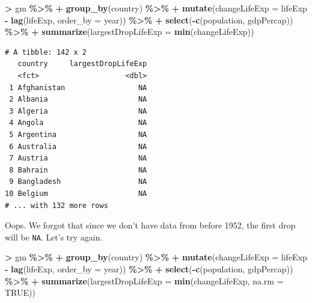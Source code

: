 \documentclass[
]{krantz}
\makeatletter
\newenvironment{Shaded}{\begin{snugshade}}{\end{snugshade}}
\newcommand{\DataTypeTok}[1]{\textcolor[rgb]{0.27,0.27,0.27}{#1}}
\newcommand{\KeywordTok}[1]{\textcolor[rgb]{0.27,0.27,0.27}{\textbf{#1}}}
\newcommand{\NormalTok}[1]{#1}
\newcommand{\OperatorTok}[1]{\textcolor[rgb]{0.43,0.43,0.43}{\textbf{#1}}}
\newcommand{\OtherTok}[1]{\textcolor[rgb]{0.37,0.37,0.37}{#1}}
\newcommand{\StringTok}[1]{\textcolor[rgb]{0.5,0.5,0.5}{#1}}
\newenvironment{kframe}{%
\medskip{}
\setlength{\fboxsep}{.8em}
 \def\at@end@of@kframe{}%
 \ifinner\ifhmode%
  \def\at@end@of@kframe{\end{minipage}}%
  \begin{minipage}{\columnwidth}%
 \fi\fi%
 \def\FrameCommand##1{\hskip\@totalleftmargin \hskip-\fboxsep
 \colorbox{shadecolor}{##1}\hskip-\fboxsep
     \hskip-\linewidth \hskip-\@totalleftmargin \hskip\columnwidth}%
 \MakeFramed {\advance\hsize-\width
   \@totalleftmargin\z@ \linewidth\hsize
   \@setminipage}}%
 {\par\unskip\endMakeFramed%
 \at@end@of@kframe}
\renewenvironment{Shaded}{\begin{kframe}}{\end{kframe}}
\makeatother
\begin{document}
\begin{Shaded}
\begin{Highlighting}[]
\OperatorTok{\textgreater{}}\StringTok{ }\NormalTok{gm }\OperatorTok{\%\textgreater{}\%}\StringTok{ }
\OperatorTok{+}\StringTok{   }\KeywordTok{group\_by}\NormalTok{(country) }\OperatorTok{\%\textgreater{}\%}\StringTok{ }
\OperatorTok{+}\StringTok{   }\KeywordTok{mutate}\NormalTok{(}\DataTypeTok{changeLifeExp =}\NormalTok{ lifeExp }\OperatorTok{{-}}\StringTok{ }\KeywordTok{lag}\NormalTok{(lifeExp, }\DataTypeTok{order\_by =}\NormalTok{ year)) }\OperatorTok{\%\textgreater{}\%}\StringTok{ }
\OperatorTok{+}\StringTok{   }\KeywordTok{select}\NormalTok{(}\OperatorTok{{-}}\KeywordTok{c}\NormalTok{(population, gdpPercap)) }\OperatorTok{\%\textgreater{}\%}\StringTok{ }
\OperatorTok{+}\StringTok{   }\KeywordTok{summarize}\NormalTok{(}\DataTypeTok{largestDropLifeExp =} \KeywordTok{min}\NormalTok{(changeLifeExp))}
\end{Highlighting}
\end{Shaded}

\begin{verbatim}
# A tibble: 142 x 2
   country     largestDropLifeExp
   <fct>                    <dbl>
 1 Afghanistan                 NA
 2 Albania                     NA
 3 Algeria                     NA
 4 Angola                      NA
 5 Argentina                   NA
 6 Australia                   NA
 7 Austria                     NA
 8 Bahrain                     NA
 9 Bangladesh                  NA
10 Belgium                     NA
# ... with 132 more rows
\end{verbatim}

Oops. We forgot that since we don't have data from before 1952, the first drop will be \texttt{NA}. Let's try again.

\begin{Shaded}
\begin{Highlighting}[]
\OperatorTok{\textgreater{}}\StringTok{ }\NormalTok{gm }\OperatorTok{\%\textgreater{}\%}\StringTok{ }
\OperatorTok{+}\StringTok{   }\KeywordTok{group\_by}\NormalTok{(country) }\OperatorTok{\%\textgreater{}\%}\StringTok{ }
\OperatorTok{+}\StringTok{   }\KeywordTok{mutate}\NormalTok{(}\DataTypeTok{changeLifeExp =}\NormalTok{ lifeExp }\OperatorTok{{-}}\StringTok{ }\KeywordTok{lag}\NormalTok{(lifeExp, }\DataTypeTok{order\_by =}\NormalTok{ year)) }\OperatorTok{\%\textgreater{}\%}\StringTok{ }
\OperatorTok{+}\StringTok{   }\KeywordTok{select}\NormalTok{(}\OperatorTok{{-}}\KeywordTok{c}\NormalTok{(population, gdpPercap)) }\OperatorTok{\%\textgreater{}\%}\StringTok{ }
\OperatorTok{+}\StringTok{   }\KeywordTok{summarize}\NormalTok{(}\DataTypeTok{largestDropLifeExp =} \KeywordTok{min}\NormalTok{(changeLifeExp, }\DataTypeTok{na.rm =} \OtherTok{TRUE}\NormalTok{))}
\end{Highlighting}
\end{Shaded}
\end{document}
